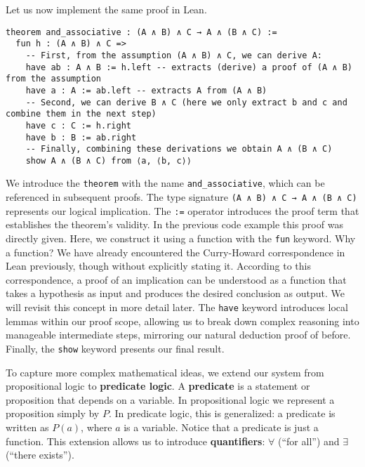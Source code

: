 \begin{example}
Let us now implement the same proof in Lean.
\begin{lstlisting}[language=Lean, caption=Associativity of Conjunction in Lean]
theorem and_associative : (A ∧ B) ∧ C → A ∧ (B ∧ C) :=
  fun h : (A ∧ B) ∧ C =>
    -- First, from the assumption (A ∧ B) ∧ C, we can derive A:
    have ab : A ∧ B := h.left -- extracts (derive) a proof of (A ∧ B) from the assumption
    have a : A := ab.left -- extracts A from (A ∧ B)
    -- Second, we can derive B ∧ C (here we only extract b and c and combine them in the next step) 
    have c : C := h.right
    have b : B := ab.right
    -- Finally, combining these derivations we obtain A ∧ (B ∧ C)
    show A ∧ (B ∧ C) from ⟨a, ⟨b, c⟩⟩
\end{lstlisting}
We introduce the \lstinline[language=lean]|theorem| with the name 
\lstinline[language=lean]|and_associative|, 
which can be referenced in subsequent proofs. 
The type signature \lstinline[language=lean]|(A ∧ B) ∧ C → A ∧ (B ∧ C)| 
represents our logical implication.
The \lstinline[language=lean]|:=| operator introduces the 
proof term that establishes the theorem's validity. 
In the previous code example this proof was directly given.
Here, we construct it using a function with the \lstinline[language=lean]|fun| keyword. 
Why a function? We have already encountered the Curry-Howard correspondence in Lean 
previously, though without explicitly stating it. 
According to this correspondence, a proof of an implication can be 
understood as a function that takes a hypothesis as input and produces 
the desired conclusion as output. We will revisit this concept in more 
detail later.
The \lstinline[language=lean]|have| keyword introduces local 
lemmas within our proof scope, allowing us to break down complex 
reasoning into manageable intermediate steps, mirroring our natural deduction proof of before.
Finally, the \lstinline[language=lean]|show| keyword presents our final result. 
\end{example}
To capture more complex mathematical ideas, we extend our system from 
propositional logic to \textbf{predicate logic}.  
A \textbf{predicate} is a statement or proposition that depends on a variable.
In propositional logic we represent a proposition simply by $P$.  
In predicate logic, this is generalized: a predicate is written as $P(a)$, 
where $a$ is a variable. Notice that a predicate is just a function.
This extension allows us to introduce \textbf{quantifiers}:  
$\forall$ (``for all'') and $\exists$ (``there exists'').  
